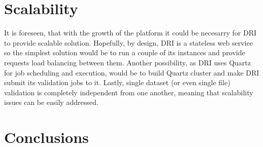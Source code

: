 \section{Scalability} 
It is foreseen, that with the growth of the platform it could be necesarry for DRI to
provide scalable solution. Hopefully, by design, DRI is a stateless web service so the
simplest solution would be to run a couple of its instances and provide requests load
balancing between them. Another possibility, as DRI uses Quartz for job scheduling and
execution, would be to build Quartz cluster and make DRI submit its validation jobs
to it. Lastly, single dataset (or even single file) validation is completely independent
from one another, meaning that scalability issues can be easily addressed.\\

\section{Conclusions}
